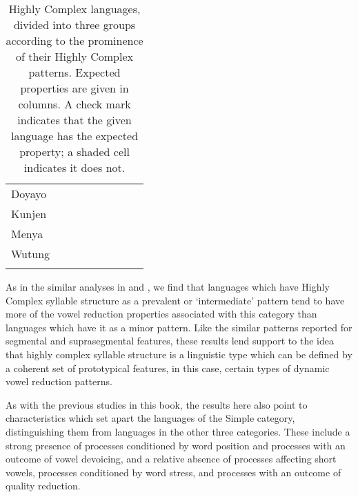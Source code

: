 \begin{table}
\begin{tabularx}{\textwidth}{lCCCCCCCC}
 Doyayo &  &  &  &  &  &  &  &  \\
 Kunjen & { } &  &  &  &  &  &  &  \\
 Menya &  &  &  &  &  &  &  &  \\
 Wutung &  &  &  &  &  &  &  &  \\
\lspbottomrule
\end{tabularx}
\caption{\label{tab:6.11}Highly Complex languages, divided into three groups according to the prominence of their Highly Complex patterns. Expected properties are given in columns. A check mark indicates that the given language has the expected property; a shaded cell indicates it does not.}
\end{table}

  As in the similar analyses in  and , we find that languages which have Highly Complex syllable structure as a prevalent or ‘intermediate’ pattern tend to have more of the vowel reduction properties associated with this category than languages which have it as a minor pattern. Like the similar patterns reported for segmental and suprasegmental features, these results lend support to the idea that highly complex syllable structure is a linguistic type which can be defined by a coherent set of prototypical features, in this case, certain types of dynamic vowel reduction patterns.

  As with the previous studies in this book, the results here also point to characteristics which set apart the languages of the Simple category, distinguishing them from languages in the other three categories. These include a strong presence of processes conditioned by word position and processes with an outcome of vowel devoicing, and a relative absence of processes affecting short vowels, processes conditioned by word stress, and processes with an outcome of quality reduction.

